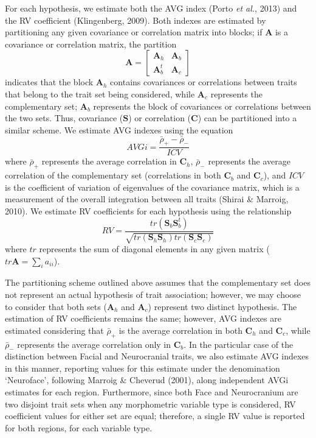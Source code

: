 \documentclass[12pt,]{article}
\begin{document}
For each hypothesis, we estimate both the AVG index (Porto \emph{et
al.}, 2013) and the RV coefficient (Klingenberg, 2009). Both indexes are
estimated by partitioning any given covariance or correlation matrix
into blocks; if $\mathbf{A}$ is a covariance or correlation matrix, the
partition \[
\mathbf{A} =
\begin{bmatrix}
\mathbf{A}_h & \mathbf{A}_b \\
\mathbf{A}^t_b & \mathbf{A}_c
\end{bmatrix}
\] indicates that the block $\mathbf{A}_h$ contains covariances or
correlations between traits that belong to the trait set being
considered, while $\mathbf{A}_c$ represents the complementary set;
$\mathbf{A}_b$ represents the block of covariances or correlations
between the two sets. Thus, covariance ($\mathbf{S}$) or correlation
($\mathbf{C}$) can be partitioned into a similar scheme. We estimate AVG
indexes using the equation \[
AVGi = \frac {\bar{\rho}_{+} - \bar{\rho}_{-}} {ICV}
\] where $\bar{\rho}_{+}$ represents the average correlation in
$\mathbf{C}_h$, $\bar{\rho}_{-}$ represents the average correlation of
the complementary set (correlations in both $\mathbf{C}_b$ and
$\mathbf{C}_c$), and $ICV$ is the coefficient of variation of
eigenvalues of the covariance matrix, which is a measurement of the
overall integration between all traits (Shirai \& Marroig, 2010). We
estimate RV coefficients for each hypothesis using the relationship \[
RV = \frac{tr(\mathbf{S}_{b}\mathbf{S}^t_{b})}{\sqrt{tr(\mathbf{S}_h \mathbf{S}_h)tr(\mathbf{S}_c \mathbf{S}_c)}}
\] where $tr$ represents the sum of diagonal elements in any given
matrix ($tr \mathbf{A} = \sum_i a_{ii}$).

The partitioning scheme outlined above assumes that the complementary
set does not represent an actual hypothesis of trait association;
however, we may choose to consider that both sets ($\mathbf{A}_h$ and
$\mathbf{A}_c$) represent two distinct hypothesis. The estimation of RV
coefficients remains the same; however, AVG indexes are estimated
considering that $\bar{\rho}_{+}$ is the average correlation in both
$\mathbf{C}_h$ and $\mathbf{C}_c$, while $\bar{\rho}_{-}$ represents the
average correlation only in $\mathbf{C}_b$. In the particular case of
the distinction between Facial and Neurocranial traits, we also estimate
AVG indexes in this manner, reporting values for this estimate under the
denomination `Neuroface', following Marroig \& Cheverud (2001), along
independent AVGi estimates for each region. Furthermore, since both Face
and Neurocranium are two disjoint trait sets when any morphometric
variable type is considered, RV coefficient values for either set are
equal; therefore, a single RV value is reported for both regions, for
each variable type.
\end{document}
